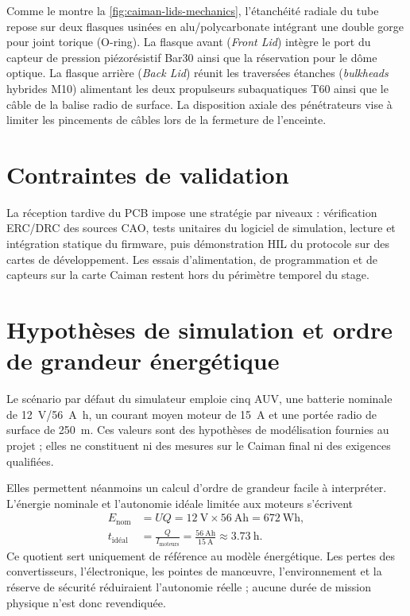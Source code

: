 Comme le montre la \cref{fig:caiman-lids-mechanics}, l'étanchéité radiale du tube repose sur deux flasques usinées en alu/polycarbonate intégrant une double gorge pour joint torique (O-ring). La flasque avant (\emph{Front Lid}) intègre le port du capteur de pression piézorésistif Bar30 ainsi que la réservation pour le dôme optique. La flasque arrière (\emph{Back Lid}) réunit les traversées étanches (\emph{bulkheads} hybrides M10) alimentant les deux propulseurs subaquatiques T60 ainsi que le câble de la balise radio de surface. La disposition axiale des pénétrateurs vise à limiter les pincements de câbles lors de la fermeture de l'enceinte.

\section{Contraintes de validation}

La réception tardive du PCB impose une stratégie par niveaux : vérification ERC/DRC des sources CAO, tests unitaires du logiciel de simulation, lecture et intégration statique du firmware, puis démonstration HIL du protocole sur des cartes de développement. Les essais d'alimentation, de programmation et de capteurs sur la carte Caiman restent hors du périmètre temporel du stage.

\section{Hypothèses de simulation et ordre de grandeur énergétique}

Le scénario par défaut du simulateur emploie cinq AUV, une batterie nominale de \SI{12}{\volt}/\SI{56}{\ampere\hour}, un courant moyen moteur de \SI{15}{\ampere} et une portée radio de surface de \SI{250}{\metre}. Ces valeurs sont des hypothèses de modélisation fournies au projet ; elles ne constituent ni des mesures sur le Caiman final ni des exigences qualifiées.

Elles permettent néanmoins un calcul d'ordre de grandeur facile à interpréter. L'énergie nominale et l'autonomie idéale limitée aux moteurs s'écrivent
\begin{align}
  E_{\mathrm{nom}} &= UQ
  = \SI{12}{\volt}\times\SI{56}{\ampere\hour}
  = \SI{672}{\watt\hour}, \\
  t_{\mathrm{idéal}} &= \frac{Q}{I_{\mathrm{moteurs}}}
  = \frac{\SI{56}{\ampere\hour}}{\SI{15}{\ampere}}
  \approx \SI{3.73}{\hour}.
\end{align}
Ce quotient sert uniquement de référence au modèle énergétique. Les pertes des convertisseurs, l'électronique, les pointes de man\oe{}uvre, l'environnement et la réserve de sécurité réduiraient l'autonomie réelle ; aucune durée de mission physique n'est donc revendiquée.
